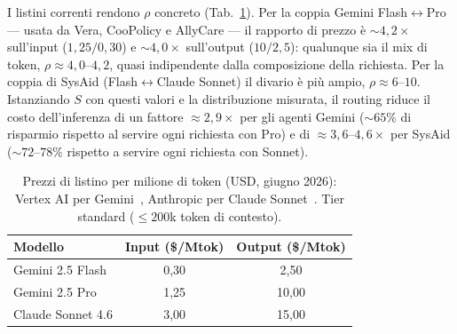 I listini correnti rendono $\rho$ concreto (Tab.~\ref{tab:eval-prezzi}).
Per la coppia Gemini Flash$\leftrightarrow$Pro --- usata da Vera, CooPolicy
e AllyCare --- il rapporto di prezzo è $\sim 4{,}2\times$ sull'input
($1{,}25/0{,}30$) e $\sim 4{,}0\times$ sull'output ($10/2{,}5$): qualunque
sia il mix di token, $\rho \approx 4{,}0$--$4{,}2$, quasi indipendente
dalla composizione della richiesta. Per la coppia di SysAid
(Flash$\leftrightarrow$Claude Sonnet) il divario è più ampio,
$\rho \approx 6$--$10$. Istanziando $S$ con questi valori e la
distribuzione misurata, il routing riduce il costo dell'inferenza di un
fattore $\approx 2{,}9\times$ per gli agenti Gemini ($\sim 65\%$ di
risparmio rispetto al servire ogni richiesta con Pro) e di
$\approx 3{,}6$--$4{,}6\times$ per SysAid ($\sim 72$--$78\%$ rispetto a
servire ogni richiesta con Sonnet).

\begin{table}[htbp]
  \centering
  \caption[Listini per milione di token]{Prezzi di listino per milione di
  token (USD, giugno 2026): Vertex AI per Gemini~\cite{gcp_gemini_pricing},
  Anthropic per Claude Sonnet~\cite{anthropic_pricing}. Tier standard
  ($\leq 200$k token di contesto).}
  \label{tab:eval-prezzi}
  \begin{tabular}{lcc}
    \toprule
    \textbf{Modello} & \textbf{Input (\$/Mtok)} & \textbf{Output (\$/Mtok)} \\
    \midrule
    Gemini 2.5 Flash    & 0,30 & 2,50 \\
    Gemini 2.5 Pro      & 1,25 & 10,00 \\
    Claude Sonnet 4.6   & 3,00 & 15,00 \\
    \bottomrule
  \end{tabular}
\end{table}

